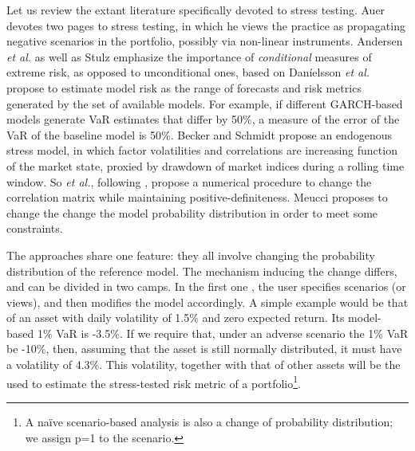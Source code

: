 \documentclass[letter, 12pt]{article}
\newcommand{\etal}{\emph{et al.}}
\begin{document}
Let us review the extant literature specifically devoted to stress testing. Auer \cite{auer2018} devotes two pages to stress testing, in which he views the practice as propagating negative scenarios in the portfolio, possibly via non-linear instruments. Andersen \etal \cite{andersen2013} as well as Stulz \cite{stulz2008} emphasize the importance of \emph{conditional} measures of extreme risk, as opposed to unconditional ones, based on Dan{\'i}elsson \etal \cite{danielsson2016} propose to estimate model risk as the range of forecasts and risk metrics generated by the set of available models. For example, if different GARCH-based models generate VaR estimates that differ by 50\%, a measure of the error of the VaR of the baseline model is 50\%. Becker and Schmidt \cite{becker2013} propose an endogenous stress model, in which factor volatilities and correlations are increasing function of the market state, proxied by drawdown of market indices during a rolling time window. So \etal \cite{so2013}, following \cite{rebonato2000}, propose a numerical procedure to change the correlation matrix while maintaining positive-definiteness. Meucci \cite{meucci2008} proposes to change the change the model probability distribution in order to meet some constraints.

The approaches share one feature: they all involve changing the probability distribution of the reference model. The mechanism inducing the change differs, and can be divided in two camps. In the first one \cite{fed2013, fed2017, fed2018, meucci2008}, the user specifies scenarios (or views), and then modifies the model accordingly. A simple example would be that of an asset with daily volatility of 1.5\% and zero expected return. Its model-based 1\% VaR is -3.5\%. If we require that, under an adverse scenario the 1\% VaR be -10\%, then, assuming that the asset is still normally distributed, it must have a volatility of 4.3\%. This volatility, together with that of other assets will be the used to estimate the stress-tested risk metric of a portfolio\footnote{A na{\"i}ve scenario-based analysis is also a change of probability distribution; we assign p=1 to the scenario.}.
\end{document}
